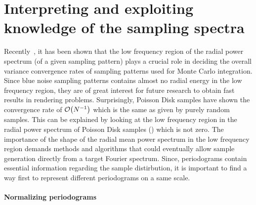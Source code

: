 \documentclass[11pt,fleqn]{book} %
\begin{document}
%
%
%



%

%

\section{Interpreting and exploiting knowledge of the sampling spectra}

Recently~\cite{Pilleboue:2015:VAM}, it has been shown that the low frequency region of the
radial power spectrum (of a given sampling pattern) plays a crucial role in deciding the overall variance convergence rates of sampling 
patterns used for Monte Carlo integration. Since blue noise sampling patterns contains almost no radial 
energy in the low frequency region, they are of great interest for future research to obtain fast results in 
rendering problems. Surprisingly, Poisson Disk samples have shown the convergence rate of $\mathcal{O}\!\left(N^{-1}\right)$ which is the same as given by purely random samples. This can be explained by looking at the low frequency region in the radial power spectrum of Poisson Disk samples () which is not zero.
The importance of the shape of the radial mean power spectrum in the  low frequency region demands  methods and algorithms that could eventually allow sample generation directly from a target Fourier spectrum. Since, periodograms contain essential information regarding the sample distirbution, it is important to find a way first to represent different periodograms on a same scale.

\paragraph{Normalizing periodograms} 
\end{document}
